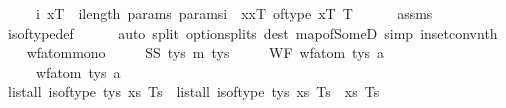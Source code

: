 \begin{isabellebody}
\ \ \ \ \ i\ xT\ \ {\isachardoublequoteopen}i{\isacharless}{\kern0pt}length\ params{\isachardoublequoteclose}\ {\isachardoublequoteopen}params{\isacharbang}{\kern0pt}i\ {\isacharequal}{\kern0pt}\ {\isacharparenleft}{\kern0pt}x{\isacharcomma}{\kern0pt}xT{\isacharparenright}{\kern0pt}{\isachardoublequoteclose}\ {\isachardoublequoteopen}of{\isacharunderscore}{\kern0pt}type\ xT\ T{\isachardoublequoteclose}\isanewline
%
\isadelimproof
\ \ \ \ %
\endisadelimproof
%
\isatagproof
{}\isamarkupfalse%
\ assms\isanewline
\ \ \ \ \isamarkupfalse%
\ is{\isacharunderscore}{\kern0pt}of{\isacharunderscore}{\kern0pt}type{\isacharunderscore}{\kern0pt}def\isanewline
\ \ \ \ \isamarkupfalse%
\ {\isacharparenleft}{\kern0pt}auto\ split{\isacharcolon}{\kern0pt}\ option{\isachardot}{\kern0pt}splits\ dest{\isacharbang}{\kern0pt}{\isacharcolon}{\kern0pt}\ map{\isacharunderscore}{\kern0pt}of{\isacharunderscore}{\kern0pt}SomeD\ simp{\isacharcolon}{\kern0pt}\ in{\isacharunderscore}{\kern0pt}set{\isacharunderscore}{\kern0pt}conv{\isacharunderscore}{\kern0pt}nth{\isacharparenright}{\kern0pt}%
\endisatagproof
{\isafoldproof}%
%
\isadelimproof
\isanewline
%
\endisadelimproof
\isanewline
\ \ \isamarkupfalse%
\ wf{\isacharunderscore}{\kern0pt}atom{\isacharunderscore}{\kern0pt}mono{\isacharcolon}{\kern0pt}\isanewline
\ \ \ \ \ SS{\isacharcolon}{\kern0pt}\ {\isachardoublequoteopen}tys\ {\isasymsubseteq}\isactrlsub m\ tys{\isacharprime}{\kern0pt}{\isachardoublequoteclose}\isanewline
\ \ \ \ \ WF{\isacharcolon}{\kern0pt}\ {\isachardoublequoteopen}wf{\isacharunderscore}{\kern0pt}atom\ tys\ a{\isachardoublequoteclose}\isanewline
\ \ \ \ \ {\isachardoublequoteopen}wf{\isacharunderscore}{\kern0pt}atom\ tys{\isacharprime}{\kern0pt}\ a{\isachardoublequoteclose}\isanewline
%
\isadelimproof
\ \ %
\endisadelimproof
%
\isatagproof
{}\isamarkupfalse%
\ {\isacharminus}{\kern0pt}\isanewline
\ \ \ \ \isamarkupfalse%
\ {\isachardoublequoteopen}list{\isacharunderscore}{\kern0pt}all{}\ {\isacharparenleft}{\kern0pt}is{\isacharunderscore}{\kern0pt}of{\isacharunderscore}{\kern0pt}type\ tys{\isacharprime}{\kern0pt}{\isacharparenright}{\kern0pt}\ xs\ Ts{\isachardoublequoteclose}\ \ {\isachardoublequoteopen}list{\isacharunderscore}{\kern0pt}all{}\ {\isacharparenleft}{\kern0pt}is{\isacharunderscore}{\kern0pt}of{\isacharunderscore}{\kern0pt}type\ tys{\isacharparenright}{\kern0pt}\ xs\ Ts{\isachardoublequoteclose}\ \ xs\ Ts\isanewline

\end{isabellebody}

